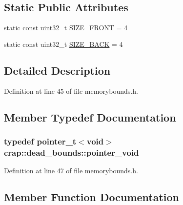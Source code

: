 \subsection*{Static Public Attributes}
\begin{DoxyCompactItemize}
\item 
static const uint32\+\_\+t \hyperlink{structcrap_1_1dead__bounds_aacd105207fa9af97704d416ff4580807}{S\+I\+Z\+E\+\_\+\+F\+R\+O\+N\+T} = 4
\item 
static const uint32\+\_\+t \hyperlink{structcrap_1_1dead__bounds_a6267a01dd25345bf0e461e195f106e83}{S\+I\+Z\+E\+\_\+\+B\+A\+C\+K} = 4
\end{DoxyCompactItemize}


\subsection{Detailed Description}


Definition at line 45 of file memorybounds.\+h.



\subsection{Member Typedef Documentation}
\hypertarget{structcrap_1_1dead__bounds_a1f3c4f9646f45b9c4f1dc351d94e96bb}{}
\subsubsection[{pointer\+\_\+void}]{\setlength{\rightskip}{0pt plus 5cm}typedef {\bf pointer\+\_\+t}$<$void$>$ {\bf crap\+::dead\+\_\+bounds\+::pointer\+\_\+void}}\label{structcrap_1_1dead__bounds_a1f3c4f9646f45b9c4f1dc351d94e96bb}


Definition at line 47 of file memorybounds.\+h.



\subsection{Member Function Documentation}
\hypertarget{structcrap_1_1dead__bounds_a95e8c5c9645fe122540da759011f73ce}{}
